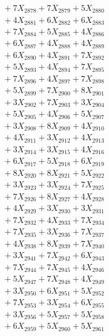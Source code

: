\documentclass[a4paper,10pt]{article}
\begin{document}
{\begin{align}
&\;  + 7 X_{2878} + 7 X_{2879} + 5 X_{2880} \\[0.3ex]
&\;  + 4 X_{2881} + 6 X_{2882} + 6 X_{2883} \\[0.3ex]
&\;  + 7 X_{2884} + 5 X_{2885} + 4 X_{2886} \\[0.3ex]
&\;  + 6 X_{2887} + 4 X_{2888} + 4 X_{2889} \\[0.5ex]\allowbreak
&\;  + 6 X_{2890} + 4 X_{2891} + 7 X_{2892} \\[0.3ex]
&\;  + 5 X_{2893} + 4 X_{2894} + 7 X_{2895} \\[0.3ex]
&\;  + 7 X_{2896} + 4 X_{2897} + 7 X_{2898} \\[0.3ex]
&\;  + 5 X_{2899} + 7 X_{2900} + 8 X_{2901} \\[0.3ex]
&\;  + 3 X_{2902} + 7 X_{2903} + 3 X_{2904} \\[0.3ex]
&\;  + 5 X_{2905} + 4 X_{2906} + 5 X_{2907} \\[0.3ex]
&\;  + 3 X_{2908} + 8 X_{2909} + 4 X_{2910} \\[0.3ex]
&\;  + 4 X_{2911} + 3 X_{2912} + 4 X_{2913} \\[0.3ex]
&\;  + 3 X_{2914} + 3 X_{2915} + 4 X_{2916} \\[0.3ex]
&\;  + 6 X_{2917} + 5 X_{2918} + 6 X_{2919} \\[0.5ex]\allowbreak
&\;  + 8 X_{2920} + 8 X_{2921} + 5 X_{2922} \\[0.3ex]
&\;  + 3 X_{2923} + 3 X_{2924} + 7 X_{2925} \\[0.3ex]
&\;  + 7 X_{2926} + 8 X_{2927} + 4 X_{2928} \\[0.3ex]
&\;  + 4 X_{2929} + 3 X_{2930} + 3 X_{2931} \\[0.3ex]
&\;  + 7 X_{2932} + 4 X_{2933} + 7 X_{2934} \\[0.3ex]
&\;  + 7 X_{2935} + 3 X_{2936} + 7 X_{2937} \\[0.3ex]
&\;  + 4 X_{2938} + 8 X_{2939} + 7 X_{2940} \\[0.3ex]
&\;  + 3 X_{2941} + 7 X_{2942} + 6 X_{2943} \\[0.3ex]
&\;  + 7 X_{2944} + 7 X_{2945} + 4 X_{2946} \\[0.3ex]
&\;  + 5 X_{2947} + 7 X_{2948} + 4 X_{2949} \\[0.5ex]\allowbreak
&\;  + 3 X_{2950} + 6 X_{2951} + 5 X_{2952} \\[0.3ex]
&\;  + 7 X_{2953} + 3 X_{2954} + 6 X_{2955} \\[0.3ex]
&\;  + 3 X_{2956} + 5 X_{2957} + 5 X_{2958} \\[0.3ex]
&\;  + 6 X_{2959} + 5 X_{2960} + 5 X_{2961} \\[0.3ex]

\end{align}}
\end{document}
